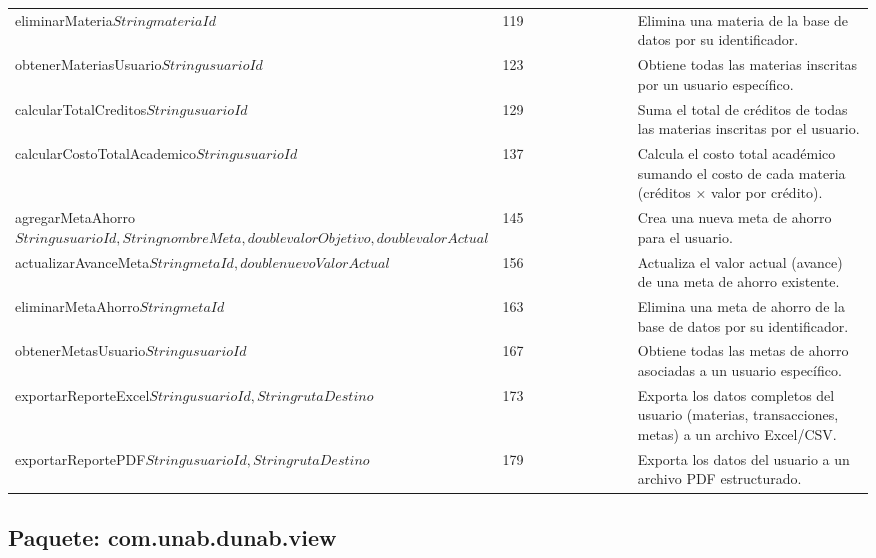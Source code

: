 \documentclass[utf8]{article}
\begin{document}
\begin{longtable}{p{0.18\linewidth}p{0.32\linewidth}p{0.5\linewidth}}
eliminarMateria\(String materiaId\) & 119 & Elimina una materia de la base de datos por su identificador. \\
obtenerMateriasUsuario\(String usuarioId\) & 123 & Obtiene todas las materias inscritas por un usuario específico. \\
calcularTotalCreditos\(String usuarioId\) & 129 & Suma el total de créditos de todas las materias inscritas por el usuario. \\
calcularCostoTotalAcademico\(String usuarioId\) & 137 & Calcula el costo total académico sumando el costo de cada materia (créditos × valor por crédito). \\
agregarMetaAhorro\(String usuarioId, String nombreMeta, double valorObjetivo, double valorActual\) & 145 & Crea una nueva meta de ahorro para el usuario. \\
actualizarAvanceMeta\(String metaId, double nuevoValorActual\) & 156 & Actualiza el valor actual (avance) de una meta de ahorro existente. \\
eliminarMetaAhorro\(String metaId\) & 163 & Elimina una meta de ahorro de la base de datos por su identificador. \\
obtenerMetasUsuario\(String usuarioId\) & 167 & Obtiene todas las metas de ahorro asociadas a un usuario específico. \\
exportarReporteExcel\(String usuarioId, String rutaDestino\) & 173 & Exporta los datos completos del usuario (materias, transacciones, metas) a un archivo Excel/CSV. \\
exportarReportePDF\(String usuarioId, String rutaDestino\) & 179 & Exporta los datos del usuario a un archivo PDF estructurado. \\
\end{longtable}

\subsection*{Paquete: com.unab.dunab.view}
\end{document}
